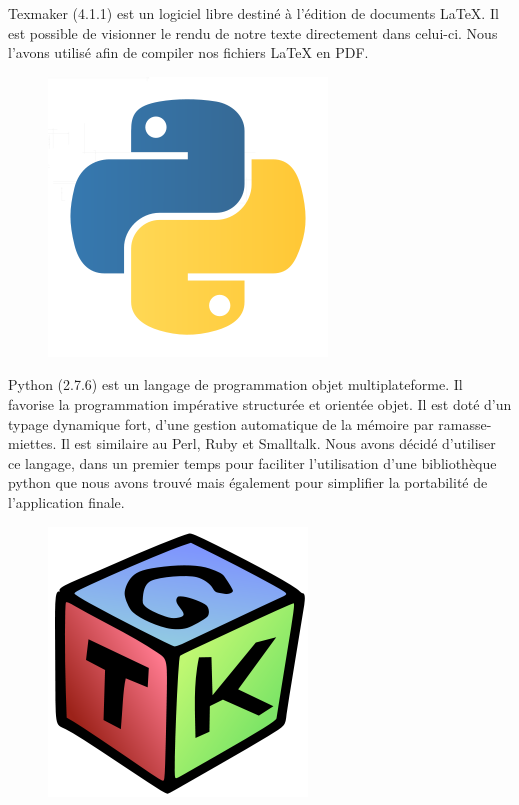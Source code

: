 \documentclass[17pts]{report}
\begin{document}
Texmaker (4.1.1) est un logiciel libre destiné à l'édition de documents LaTeX.
Il est possible de visionner le rendu de notre texte directement dans celui-ci.
Nous l'avons utilisé afin de compiler nos fichiers LaTeX en PDF.\\

\begin{figure}[H]
    \includegraphics[scale=0.2]{illustrations/python.png}
    \centering
\end{figure}

Python (2.7.6) est un langage de programmation objet multiplateforme.  Il
favorise la programmation impérative structurée et orientée objet. Il est doté
d'un typage dynamique fort, d'une gestion automatique de la mémoire par
ramasse-miettes. Il est similaire au Perl, Ruby et Smalltalk.  Nous avons
décidé d'utiliser ce langage, dans un premier temps pour faciliter
l'utilisation d'une bibliothèque python que nous avons trouvé mais également
pour simplifier la portabilité de l'application finale.\\

\begin{figure}[H]
    \includegraphics[scale=0.2]{illustrations/gtk.png}
    \centering
\end{figure}
\end{document}
